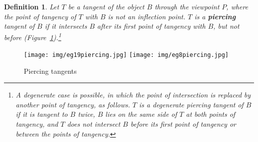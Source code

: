 \documentclass[10pt,twocolumn]{article}
\newcommand{\seg}[1]{\mbox{$\overline{#1}$}}
\newtheorem{defn2}{Definition}
\newif\ifJournal
\begin{document}

\begin{defn2}
Let $T$ be a tangent of the object $B$ through the viewpoint $P$,
where the point of tangency of $T$ with $B$ is not an inflection point.
$T$ is a {\bf piercing} tangent of $B$ %
if
it intersects $B$ after its first point of tangency with $B$, but not before
(Figure~\ref{fig:piercing}).\footnote{A degenerate case
  is possible,
  in which the point of intersection is replaced by another point of tangency, as follows.
  $T$ is a degenerate piercing tangent of $B$ if it is tangent to $B$ twice,
  $B$ lies on the same side of $T$ at both points of tangency,
  and $T$ does not intersect $B$ before its first point of tangency 
  or between the points of tangency.}
\end{defn2}

\ifJournal
Figure of degenerate piercing tangent (EG9)
\fi

\ifJournal
The avoidance of inflection points in the definition of piercing tangent
is explained by Figure~\ref{fig:piercingdegenerate}.
\fi

\begin{figure}
\begin{center}
\texttt{[image: img/eg19piercing.jpg]}
\texttt{[image: img/eg8piercing.jpg]}
\end{center}
\caption{Piercing tangents}
\label{fig:piercing}
\end{figure}

\ifJournal
\begin{figure}
\begin{center}
\texttt{[image: img/piercingInflection.jpg]}
\end{center}
\caption{(a) A piercing tangent at an inflection point should not be counted
         (b) Degenerate piercing tangent (EG9)}
\label{fig:piercingdegenerate}
\end{figure}
\fi
 
\end{document}
